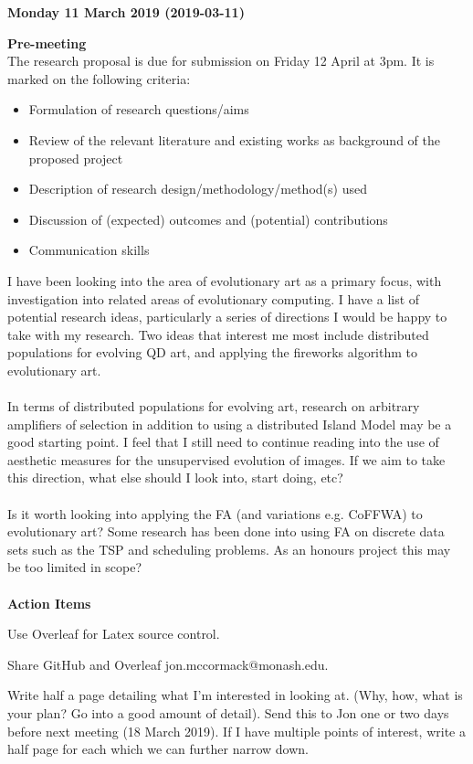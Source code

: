 \documentclass[10pt,a4paper]{article}
\newcommand{\cmark}{\ding{51}}%
\newcommand{\done}{\rlap{$\square$}{\raisebox{2pt}{\large\hspace{1pt}\cmark}}%
	\hspace{-2.5pt}}
\begin{document}
	\begin{center} \textbf{Monday 11 March 2019 (2019-03-11)} \end{center} 
	\textbf{Pre-meeting}
	\\
	The research proposal is due for submission on Friday 12 April at 3pm.
	It is marked on the following criteria:
	\begin{itemize}
		\item Formulation of research questions/aims
		\item Review of the relevant literature and existing works as background of the proposed project
		\item Description of research design/methodology/method(s) used
		\item Discussion of (expected) outcomes and (potential) contributions
		\item Communication skills
	\end{itemize}
	I have been looking into the area of evolutionary art as a primary focus, with investigation into related areas of evolutionary computing.
	I have a list of potential research ideas, particularly a series of directions I would be happy to take with my research.
	Two ideas that interest me most include distributed populations for evolving QD art, and applying the fireworks algorithm to evolutionary art.
	\\\\
	In terms of distributed populations for evolving art, research on arbitrary amplifiers of selection \citep{graph-amplifiers} in addition to using a distributed Island Model \citep{distributed-evolutionary-art} may be a good starting point.
	I feel that I still need to continue reading into the use of aesthetic measures for the unsupervised evolution of images.
	If we aim to take this direction, what else should I look into, start doing, etc?
	\\\\
	Is it worth looking into applying the FA (and variations e.g. CoFFWA) to evolutionary art?
	Some research has been done into using FA on discrete data sets such as the TSP and scheduling problems.
	As an honours project this may be too limited in scope?
	\\\\
	\textbf{Action Items}
	\begin{todolist}
		\item[\done] Use Overleaf for Latex source control.
		\item[\done] Share GitHub and Overleaf jon.mccormack@monash.edu. 
		\item[\done] Write half a page detailing what I'm interested in looking at. (Why, how, what is your plan? Go into a good amount of detail). 
		Send this to Jon one or two days before next meeting (18 March 2019).
		If I have multiple points of interest, write a half page for each which we can further narrow down.
	\end{todolist}
\end{document}
